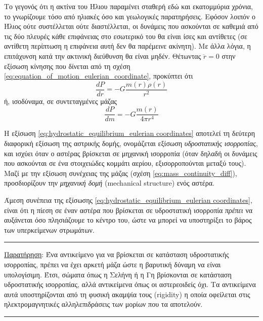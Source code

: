 Το γεγονός ότι η ακτίνα του Ήλιου παραμένει σταθερή εδώ και εκατομμύρια χρόνια, το γνωρίζουμε τόσο από ηλιακές όσο και γεωλογικές παρατηρήσεις. Εφόσον λοιπόν ο Ήλιος ούτε συστέλλεται ούτε διαστέλλεται, οι δυνάμεις που ασκούνται σε καθεμιά από τις δύο πλευρές κάθε επιφάνειας στο εσωτερικό του θα είναι ίσες και αντίθετες (σε αντίθετη περίπτωση η επιφάνεια αυτή δεν θα παρέμεινε ακίνητη). Με άλλα λόγια, η επιτάχυνση κατά την ακτινική διεύθυνση θα είναι μηδέν. Θέτωντας $\ddot{r} = 0$ στην εξίσωση κίνησης που δίνεται από τη σχέση \eqref{eq:equation_of_motion_eulerian_coordinate}, προκύπτει ότι
\begin{equation}
    \label{eq:hydrostatic_equilibrium_eulerian coordinates}
    \boxed{\frac{dP}{dr} = - G \frac{m(r) \rho(r)}{r^2}}
\end{equation}
ή, ισοδύναμα, σε συντεταγμένες μάζας
\begin{equation}
    \label{eq:hydrostatic_equilibrium_lagrangian_coordinate}
    \boxed{\frac{dP}{dm} = - G \frac{m(r)}{4\pi r^4}}
\end{equation}

Η εξίσωση \eqref{eq:hydrostatic_equilibrium_eulerian coordinates} αποτελεί τη δεύτερη διαφορική εξίσωση της αστρικής δομής, ονομάζεται εξίσωση \textit{υδροστατικής ισορροπίας}, και ισχύει όταν ο αστέρας βρίσκεται σε μηχανική ισορροπία (όταν δηλαδή οι δυνάμεις που ασκούνται σε ένα στοιχειώδες κομμάτι αερίου, εξισορροπούνται μεταξύ τους). Μαζί με την εξίσωση συνέχειας της μάζας (σχέση \eqref{eq:mass_continuity_diff}), προσδιορίζουν την \textit{μηχανική δομή} (mechanical structure) ενός αστέρα.

Άμεση συνέπεια της εξίσωσης \eqref{eq:hydrostatic_equilibrium_eulerian coordinates}, είναι ότι η πίεση σε έναν αστέρα που βρίσκεται σε υδροστατική ισορροπία \textit{πρέπει} να αυξάνεται όσο πλησιάζουμε το κέντρο του, ώστε να μπορεί να υποστηρίξει το βάρος των υπερκείμενων στρωμάτων.\\

{\color{red} \hrule}
\underline{Παρατήρηση}: Ένα αντικείμενο για να βρίσκεται σε κατάσταση υδροστατικής ισορροπίας, πρέπει να έχει αρκετή μάζα ώστε η βαρυτική δύναμη να είναι υπολογίσιμη. Έτσι, σώματα όπως η Σελήνη ή η Γη βρίσκονται σε κατάσταση υδροστατικής ισορροπίας, αλλά αντικείμενα όπως οι αστερεοιδείς όχι. Τα αντικείμενα αυτά υποστηρίζονται από τη φυσική ακαμψία τους (rigidity) η οποία οφείλεται στις ηλεκτρομαγνητικές αλληλεπιδράσεις των μορίων που τα αποτελούν.\\
{\color{red} \hrule}


